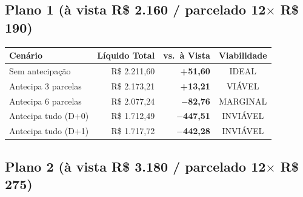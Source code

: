 \documentclass[12pt, a4paper]{article}
\newcommand{\reais}[1]{R\$ #1}
\begin{document}
\subsection{Plano 1 (à vista R\$ 2.160 / parcelado 12$\times$ R\$ 190)}

\begin{table}[H]
    \centering
    \renewcommand{\arraystretch}{1.4}
    \begin{tabularx}{\textwidth}{X r r c}
        \toprule
        \rowcolor{tableHeader} \textbf{Cenário} & \textbf{Líquido Total} & \textbf{vs.\ à Vista} & \textbf{Viabilidade} \\
        \midrule
        Sem antecipação & \reais{2.211,60} & \textcolor{successGreen}{\textbf{+51,60}} & \textcolor{successGreen}{IDEAL} \\
        \rowcolor{lightGray}
        Antecipa 3 parcelas & \reais{2.173,21} & \textcolor{successGreen}{\textbf{+13,21}} & \textcolor{successGreen}{VIÁVEL} \\
        Antecipa 6 parcelas & \reais{2.077,24} & \textcolor{warningOrange}{\textbf{$-$82,76}} & \textcolor{warningOrange}{MARGINAL} \\
        \rowcolor{lightGray}
        Antecipa tudo (D+0) & \reais{1.712,49} & \textcolor{dangerRed}{\textbf{$-$447,51}} & \textcolor{dangerRed}{INVIÁVEL} \\
        Antecipa tudo (D+1) & \reais{1.717,72} & \textcolor{dangerRed}{\textbf{$-$442,28}} & \textcolor{dangerRed}{INVIÁVEL} \\
        \bottomrule
    \end{tabularx}
\end{table}

\subsection{Plano 2 (à vista R\$ 3.180 / parcelado 12$\times$ R\$ 275)}
\end{document}
